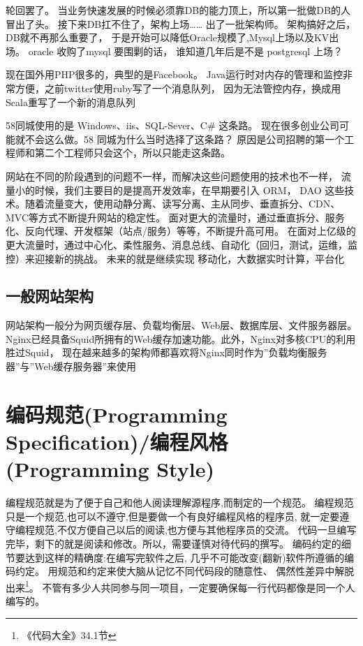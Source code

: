 \documentclass{book}
\begin{document}
轮回罢了。 当业务快速发展的时候必须靠DB的能力顶上，所以第一批做DB的人冒出了头。 
接下来DB扛不住了，架构上场…… 出了一批架构师。 架构搞好之后，DB就不再那么重要了，
于是开始可以降低Oracle规模了,Mysql上场以及KV出场。 oracle 收购了mysql 要围剿的话，
谁知道几年后是不是 postgresql 上场？

现在国外用PHP很多的，典型的是Facebook。 Java运行时对内存的管理和监控非常方便，之前twitter使用ruby写了一个消息队列，
因为无法管控内存，换成用Scala重写了一个新的消息队列

58同城使用的是 Windows、iis、SQL-Sever、C\# 这条路。
现在很多创业公司可能就不会这么做。58 同城为什么当时选择了这条路？
原因是公司招聘的第一个工程师和第二个工程师只会这个，所以只能走这条路。

网站在不同的阶段遇到的问题不一样，而解决这些问题使用的技术也不一样，
流量小的时候，我们主要目的是提高开发效率，在早期要引入 ORM，
DAO 这些技术。随着流量变大，使用动静分离、读写分离、主从同步、垂直拆分、CDN、MVC等方式不断提升网站的稳定性。
面对更大的流量时，通过垂直拆分、服务化、反向代理、开发框架（站点/服务）等等，不断提升高可用。
在面对上亿级的更大流量时，通过中心化、柔性服务、消息总线、自动化（回归，测试，运维，监控）来迎接新的挑战。
未来的就是继续实现 移动化，大数据实时计算，平台化

\subsection{一般网站架构}

网站架构一般分为网页缓存层、负载均衡层、Web层、数据库层、文件服务器层。
Nginx已经具备Squid所拥有的Web缓存加速功能。此外，Nginx对多核CPU的利用胜过Squid，
现在越来越多的架构师都喜欢将Nginx同时作为”负载均衡服务器”与”Web缓存服务器”来使用




\section{编码规范(Programming Specification)/编程风格(Programming Style)}

编程规范就是为了便于自己和他人阅读理解源程序,而制定的一个规范。
编程规范只是一个规范,也可以不遵守,但是要做一个有良好编程风格的程序员,
就一定要遵守编程规范,不仅方便自己以后的阅读,也方便与其他程序员的交流。
代码一旦编写完毕，剩下的就是阅读和修改。所以，需要谨慎对待代码的撰写。
编码约定的细节要达到这样的精确度:在编写完软件之后,
几乎不可能改变(翻新)软件所遵循的编码约定。
用规范和约定来使大脑从记忆不同代码段的随意性、
偶然性差异中解脱出来\footnote{《代码大全》34.1节}。
不管有多少人共同参与同一项目，一定要确保每一行代码都像是同一个人编写的。
\end{document}
